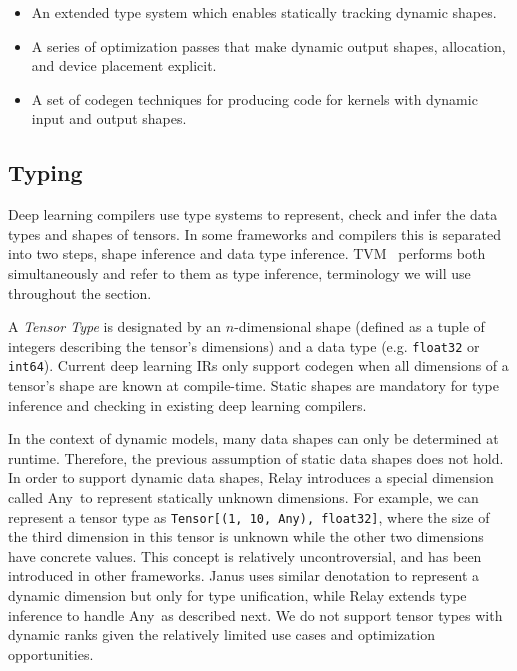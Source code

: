         \begin{itemize}
            \item An extended type system which enables statically tracking dynamic shapes.
            \item A series of optimization passes that make dynamic output shapes, allocation, and device placement explicit.
            \item A set of codegen techniques for producing code for kernels with dynamic input and output shapes.
        \end{itemize}

        \subsection{Typing}
        \label{sec:compliation:typing}
        Deep learning compilers use type systems to represent, check and infer the data types and shapes of tensors. In some frameworks and compilers this is separated into two steps, shape inference and data type inference. TVM~\citep{roesch2019relay} performs both simultaneously and refer to them as type inference, terminology we will use throughout the section.

        A {\em Tensor Type} is designated by an $n$-dimensional shape (defined as a tuple of integers describing the tensor's dimensions) and a data type (e.g. \texttt{float32} or \texttt{int64}).
        Current deep learning IRs only support codegen when all dimensions of a tensor's shape are known at compile-time.
        Static shapes are mandatory for type inference and checking in existing deep learning compilers.

        In the context of dynamic models, many data shapes can only be determined at runtime. Therefore, the previous assumption of static data shapes does not hold.
        In order to support dynamic data shapes, Relay introduces a special dimension called Any~to represent statically unknown dimensions.
        For example, we can represent a tensor type as \texttt{Tensor[(1, 10, Any), float32]},
        where the size of the third dimension in this tensor is unknown while the other
        two dimensions have concrete values.
        This concept is relatively uncontroversial, and has been introduced in other frameworks.
        Janus \citep{jeong2019janus} uses similar denotation to represent a dynamic dimension but only for type unification, while Relay extends type inference to handle Any~as described next. We do not support tensor types with dynamic ranks given the relatively limited use cases and optimization opportunities.

